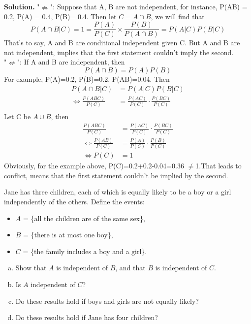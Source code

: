 \documentclass{article}
\begin{document}
{\bf Solution.}
"$\nRightarrow$": Suppose that A, B are not independent, for instance, P(AB) = 0.2, P(A) = 0.4, P(B)= 0.4. Then let $C=A\cap B$, we will find that 
$$ P(A\cap B|C) = 1 = \frac{P(A)}{P(C)} \times \frac{P(B)}{P(A\cap B)}=P(A|C)P(B|C)$$
That's to say, A and B are conditional independent given C. But A and B are not independent, implies that the first statement couldn't imply the second. \\
"$\nLeftarrow$": If A and B are independent, then 
$$ P(A\cap B)=P(A)P(B) $$
For example, P(A)=0.2, P(B)=0.2, P(AB)=0.04. Then 
$$ \begin{align}
    P(A\cap B | C)&=P(A|C)P(B|C)\\
    \iff \frac{P(ABC)}{P(C)}&=\frac{P(AC)}{P(C)}\cdot \frac{P(BC)}{P(C)}\\
\end{align} $$
Let C be $A\cup B$, then
$$ \begin{align}
    \frac{P(ABC)}{P(C)}&=\frac{P(AC)}{P(C)}\cdot \frac{P(BC)}{P(C)}\\
    \iff \frac{P(AB)}{P(C)}&=\frac{P(A)}{P(C)}\cdot \frac{P(B)}{P(C)}\\
    \iff P(C)&= 1
\end{align} $$
Obviously, for the example above, P(C)=0.2+0.2-0.04=0.36 $\neq $1.That leads to conflict, means that the first statement couldn't be implied by the second.
\begin{question}
Jane has three children, each of which is equally likely to be a boy or a girl independently of the others. Define the events:

\begin{itemize}
    \item $A$ = \{all the children are of the same sex\},
    \item $B$ = \{there is at most one boy\},
    \item $C$ = \{the family includes a boy and a girl\}.
\end{itemize}

\begin{enumerate}[(a)]
    \item Show that $A$ is independent of $B$, and that $B$ is independent of $C$.
    \item Is $A$ independent of $C$?
    \item Do these results hold if boys and girls are not equally likely?
    \item Do these results hold if Jane has four children?
\end{enumerate}
\end{question}
\end{document}
